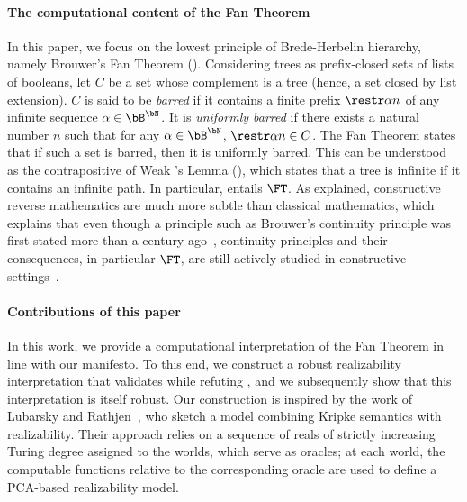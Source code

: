 \paragraph{The computational content of the Fan Theorem}


In this paper, we focus on the lowest principle of Brede-Herbelin hierarchy, namely Brouwer's Fan Theorem (\FT). Considering trees as prefix-closed sets of lists of booleans, let $C$ be a set whose complement is a tree (hence, a set closed by list extension).
$C$ is said to be \emph{barred} if it contains a finite prefix $\restr \alpha n$ of any infinite sequence %
$\alpha\in\bB^\bN$. It is \emph{uniformly barred} if there exists a natural number $n$ such that for any
$\alpha\in\bB^\bN$, $\restr\alpha n\in C$.
The Fan Theorem states that if such a set is barred, then it is uniformly barred. This can be understood as the contrapositive of Weak \Konig's Lemma (\WKL), which states that a tree is infinite if it contains an infinite path.
In particular, \WKL entails $\FT$.
As explained, constructive reverse mathematics are much more subtle than classical mathematics, which explains that even though a principle such as Brouwer's continuity principle was first stated more than a century ago~\cite{Brouwer1919}, continuity principles and their consequences, in particular $\FT$, are still actively studied in constructive settings~\cite{VanAttenVanDalen2002,VeldmanBrouwer2022,BergerDecomposition2009,FujiwaraExtensionEquivalenceBrouwers2022,FujiwaraChoicePrinciplesCharacterizing2025,BaiEtAl25,CohRah23}.



\paragraph{Contributions of this paper}
In this work, we provide a computational interpretation of the Fan Theorem in line with our manifesto. To this end, we construct a robust realizability interpretation that validates \FT while refuting \WKL, and we subsequently show that this interpretation is itself robust.
Our construction is inspired by the work of Lubarsky and Rathjen~\cite{LubRat13}, who sketch a model combining Kripke semantics with realizability. Their approach relies on a sequence of reals of strictly increasing Turing degree assigned to the worlds, which serve as oracles; at each world, the computable functions relative to the corresponding oracle are used to define a PCA-based realizability model.

